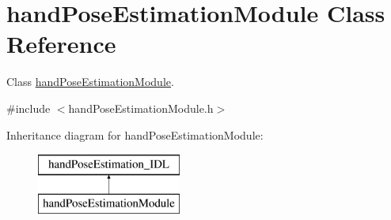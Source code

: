 \section{hand\+Pose\+Estimation\+Module Class Reference}
\label{classhandPoseEstimationModule}


Class \hyperlink{classhandPoseEstimationModule}{hand\+Pose\+Estimation\+Module}.  




{\ttfamily \#include $<$hand\+Pose\+Estimation\+Module.\+h$>$}

Inheritance diagram for hand\+Pose\+Estimation\+Module\+:\begin{figure}[H]
\begin{center}
\leavevmode
\includegraphics[height=2.000000cm]{classhandPoseEstimationModule}
\end{center}
\end{figure}
